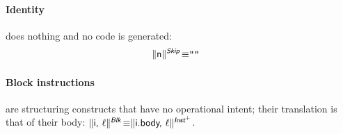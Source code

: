 \documentclass{llncs}
\newcommand{\trad}[2]{\ensuremath{\lVert \textsf{#1} \rVert^{\textit{#2}}}}
\DeclareMathOperator{\isdef}{\equiv}
\newcommand{\llvm}[1]{\texttt{#1}}
\newcommand{\B}[1]{\textsf{#1}}
\newcommand{\ListOf}[1]{$\mbox{#1}^+$}
\begin{document}
\begin{enumerate}
\paragraph{Identity} does nothing and no code is generated:
\begin{align*}
\begin{split}
  \trad{n}{\B{Skip}} \isdef & \llvm{""}
\end{split}
\end{align*}

\paragraph{Block instructions} are structuring constructs that have no
operational intent; their translation is that of their body: $\trad{i,
  $\ell$}{\B{Blk}} \isdef \trad{i.body, $\ell$}{\ListOf{\B{Inst}}}$.



\end{enumerate}
\end{document}
